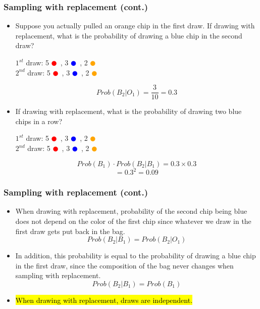 \documentclass[slidestop,compress,mathserif]{beamer}
\begin{document}
\begin{frame}
\frametitle{Sampling with replacement (cont.)}

\begin{itemize}

\item Suppose you actually pulled an orange chip in the first draw. If drawing with replacement, what is the probability of drawing a blue chip in the second draw?

\pause

\begin{center}
$1^{st}$ draw: 5 \textcolor{red}{$\CIRCLE$}~, 3 \textcolor{blue}{$\CIRCLE$}~, 2 \textcolor{orange}{$\CIRCLE$} \\
\pause
$2^{nd}$ draw: 5 \textcolor{red}{$\CIRCLE$}~, 3 \textcolor{blue}{$\CIRCLE$}~, 2 \textcolor{orange}{$\CIRCLE$}
\end{center}
\pause
\[ Prob(B_2 | O_1) = \frac{3}{10} = 0.3 \]

\pause
\item If drawing with replacement, what is the probability of drawing two blue chips in a row?
\begin{center}

\pause
$1^{st}$ draw: 5 \textcolor{red}{$\CIRCLE$}~, 3 \textcolor{blue}{$\CIRCLE$}~, 2 \textcolor{orange}{$\CIRCLE$} \\
$2^{nd}$ draw: 5 \textcolor{red}{$\CIRCLE$}~, 3 \textcolor{blue}{$\CIRCLE$}~, 2 \textcolor{orange}{$\CIRCLE$}
\end{center}
\pause
\[ Prob(B_1) \cdot Prob(B_2 | B_1) = 0.3 \times 0.3 \]
\[ = 0.3^2 = 0.09 \]

\end{itemize}

\end{frame}


\begin{frame}
\frametitle{Sampling with replacement (cont.)}

\begin{itemize}

\item When drawing with replacement, probability of the second chip being blue does not depend on the color of the first chip since whatever we draw in the first draw gets put back in the bag.
\[ Prob(B_2 | B_1) = Prob(B_2 | O_1) \]

\item In addition, this probability is equal to the probability of drawing a blue chip in the first draw, since the composition of the bag never changes when sampling with replacement.
\[ Prob(B_2 | B_1) = Prob(B_1) \]

\item \hl{When drawing with replacement, draws are independent.}

\end{itemize}

\end{frame}
\end{document}
